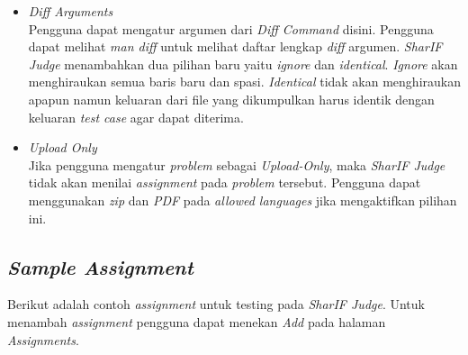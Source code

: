 \begin{itemize}
	\item \textit{Diff Arguments} \\
	Pengguna dapat mengatur argumen dari \textit{Diff Command} disini. Pengguna dapat melihat \textit{man diff} untuk melihat daftar lengkap \textit{diff} argumen. \textit{SharIF Judge} menambahkan dua pilihan baru yaitu \textit{ignore} dan \textit{identical}. \textit{Ignore} akan menghiraukan semua baris baru dan spasi. \textit{Identical} tidak akan menghiraukan apapun namun keluaran dari file yang dikumpulkan harus identik dengan keluaran \textit{test case} agar dapat diterima.
	
	\item \textit{Upload Only} \\
	Jika pengguna mengatur \textit{problem} sebagai \textit{Upload-Only}, maka \textit{SharIF Judge} tidak akan menilai \textit{assignment} pada \textit{problem} tersebut. Pengguna dapat menggunakan \textit{zip} dan \textit{PDF} pada \textit{allowed languages} jika mengaktifkan pilihan ini.
	
\end{itemize}

\subsection{\textit{Sample Assignment}}
\label{subsec:sample_assignment}
Berikut adalah contoh \textit{assignment} untuk testing pada \textit{SharIF Judge}. Untuk menambah \textit{assignment} pengguna dapat menekan \textit{Add} pada halaman \textit{Assignments}.

